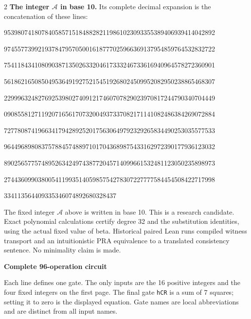 \documentclass[10pt]{article}
\begin{document}
\begin{multicols}{2}
\textbf{The integer $\mathcal A$ in base 10.}
Its complete decimal expansion is the concatenation of these lines:\par
\begingroup\fontsize{7.7}{8.2}\selectfont{}\par
95398074180784058571518488282119861023093355389406939414042892\par
97455773992193784795705001618777025966369137954859764532832722\par
75411843410809038713502633204617333246733616940964578272360901\par
56186216508504953649192752154519268024509952082950238865468307\par
22999632482769253980274091217460707829023970817244790340704449\par
09085581271192071656170732004937337082171141082486384269072884\par
72778087419663417942892520175630649792329265834490253035577533\par
96449689808375788457488971017043689875433162972390177936123032\par
89025657757489526342497438772045714099661532481123050235898973\par
27443609903800541199351405985754278307227777584454508422717998\par
334113564409335346074892680328437\par
\endgroup
\normalfont\fontsize{7.7}{8.2}\selectfont
The fixed integer $\mathcal A$ above is written in base 10. This is a research
candidate. Exact polynomial calculations certify degree 32 and the
substitution identities, using the actual fixed value of beta. Historical paired
Lean runs compiled witness transport and an intuitionistic PRA equivalence to
a translated consistency sentence. No
minimality claim is made.
\end{multicols}
\clearpage
\begin{center}{\large\bfseries Complete 96-operation circuit}\end{center}
Each line defines one gate. The only inputs are the 16 positive integers and
the four fixed integers on the first page. The final gate \texttt{hCR} is a
sum of 7 squares; setting it to zero is the displayed equation. Gate names
are local abbreviations and are distinct from all input names.
\end{document}
